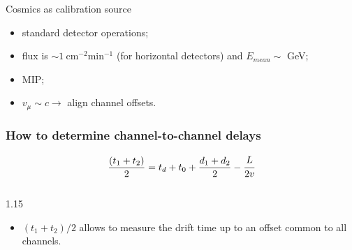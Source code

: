 \documentclass{beamer}
\begin{document}
\begin{frame}{Cosmics as calibration source}

      \begin{itemize}
     \item standard detector operations;
    \item flux is $\sim 1 \ \text{cm}^{-2} \text{min}^{-1}$ (for horizontal detectors) and $E_{mean}\sim$ GeV;
    \item MIP;
    \item $v_{\mu}\sim c \rightarrow$ align channel offsets.
    \end{itemize}

\end{frame}

\begin{frame}
    \frametitle{How to determine channel-to-channel delays}
$$
            \frac{(t_1 + t_2)}{2} = t_d+t_0+\frac{d_1+d_2}{2}-\cfrac{L}{2v} 
 $$
 \begin{columns}
    \begin{column}{1.15\framewidth}
 \begin{itemize}
    \item $(t_1 + t_2) / 2$ allows to measure the drift time  
    up to an offset common to all channels.

 \end{itemize}

\end{column}
    \end{columns}
\end{frame}
\end{document}
